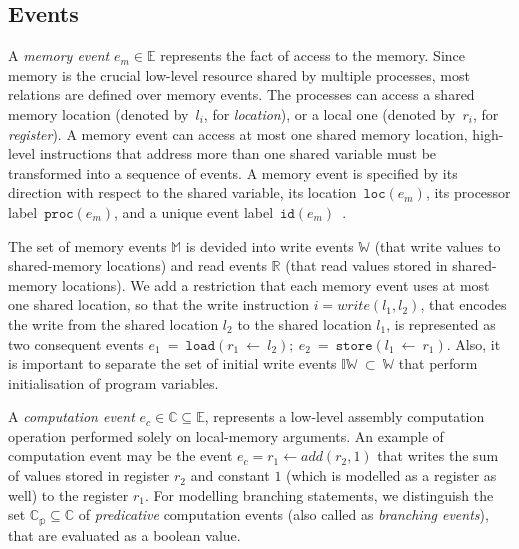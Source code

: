 \subsection{Events}
\label{ch:wmm:model:events}


A \textit{memory event} $e_m \in \mathbb{E}$ represents the fact of access to the memory. Since memory is the crucial low-level resource shared by multiple processes, most relations are defined over memory events. 
The processes can access a shared memory location (denoted by~$l_i$, for \textit{location}), or a local one (denoted by~$r_i$, for \textit{register}). A memory event can access at most one shared memory location, high-level instructions that address more than one shared variable must be transformed into a sequence of events. A memory event is specified by its direction with respect to the shared variable, its location~$\mathtt{loc}(e_m)$, its processor label~$\mathtt{proc}(e_m)$, and a unique event label~$\mathtt{id}(e_m)$~\cite{alglave2010shared}. 

The set of memory events $\mathbb{M}$ is devided into write events $\mathbb{W}$ (that write values to shared-memory locations) and read events $\mathbb{R}$ (that read values stored in shared-memory locations).
We add a restriction that each memory event uses at most one shared location, so that the write instruction $i = write(l_1, l_2)$, that encodes the write from the shared location $l_2$ to the shared location $l_1$, is represented as two consequent events $e_1~=~\mathtt{load}(r_1~\leftarrow~l_2); \ e_2~=~\mathtt{store}(l_1~\leftarrow~r_1)$.
Also, it is important to separate the set of initial write events $\mathbb{IW}~\subset~\mathbb{W}$ that perform initialisation of program variables.

A \textit{computation event} $e_c \in \mathbb{C} \subseteq \mathbb{E}$, represents a low-level assembly computation operation performed solely on local-memory arguments. An example of computation event may be the event $e_c = r_1 \leftarrow add(r_2, 1)$ that writes the sum of values stored in register $r_2$ and constant $1$ (which is modelled as a register as well) to the register $r_1$. 
For modelling branching statements, we distinguish the set $\mathbb{C_{p}} \subseteq \mathbb{C}$ of \textit{predicative} computation events (also called as \textit{branching events}), that are evaluated as a boolean value.


